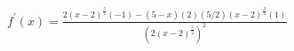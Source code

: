 $ \displaystyle f^{\prime}(x) = \frac{2(x-2)^{\frac{5}{2}}(-1) - (5 - x)(2)(5/2)(x-2)^{\frac{3}{2}}(1)}{(2(x-2)^{\frac{5}{2}})^2} $